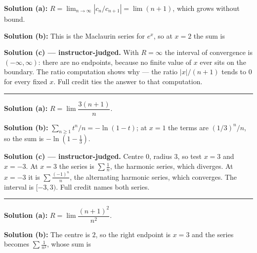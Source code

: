 \documentclass[12pt]{article}
\begin{document}



\textbf{Solution (a):} $R = \lim_{n\to\infty}\left|c_n/c_{n+1}\right| = \lim (n+1)$, which grows without bound. 

\textbf{Solution (b):} This is the Maclaurin series for $e^{x}$, so at $x = 2$ the sum is 

\textbf{Solution (c) --- instructor-judged.} With $R = \infty$ the interval of convergence is $(-\infty, \infty)$: there are no endpoints, because no finite value of $x$ ever sits on the boundary. The ratio computation shows why --- the ratio $|x|/(n+1)$ tends to $0$ for every fixed $x$. Full credit ties the answer to that computation.

\vspace{0.2cm}\noindent\rule{\linewidth}{0.2pt}\vspace{0.2cm}


\textbf{Solution (a):} $R = \lim \dfrac{3(n+1)}{n}$. 

\textbf{Solution (b):} $\sum_{n\ge1} t^{n}/n = -\ln(1-t)$; at $x = 1$ the terms are $(1/3)^n/n$, so the sum is $-\ln\left(1 - \tfrac{1}{3}\right)$. 

\textbf{Solution (c) --- instructor-judged.} Centre $0$, radius $3$, so test $x = 3$ and $x = -3$. At $x = 3$ the series is $\sum \frac{1}{n}$, the harmonic series, which diverges. At $x = -3$ it is $\sum \frac{(-1)^n}{n}$, the alternating harmonic series, which converges. The interval is $[-3, 3)$. Full credit names both series.

\vspace{0.2cm}\noindent\rule{\linewidth}{0.2pt}\vspace{0.2cm}


\textbf{Solution (a):} $R = \lim \dfrac{(n+1)^{2}}{n^{2}}$. 

\textbf{Solution (b):} The centre is $2$, so the right endpoint is $x = 3$ and the series becomes $\sum \frac{1}{n^{2}}$, whose sum is 
\end{document}
